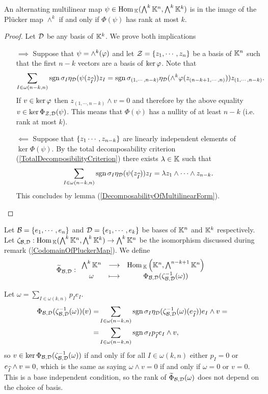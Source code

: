 \begin{proposition}\label{RankCriterionForImageOfPlucker}
An alternating multilinear map $\psi\in \mathrm{Hom}\,_{\mathbb{K}}(\bigwedge^k\mathbb{K}^n,\bigwedge^k\mathbb{K}^k)$ is in the image of the Pl\"ucker map $\wedge^k$ if and only if $\Phi(\psi)$ has rank at most $k$.
\end{proposition}
\begin{proof}
Let $\mathcal{D}$ be any basis of $\mathbb{K}^k$. We prove both implications
\setlength{\leftmargini}{0cm}
\begin{itemize}
\item[$\boxed{\implies}$] Suppose that $\psi=\wedge^k(\varphi)$ and let $\mathcal{Z}=\left\{{z_1,\cdots, z_{n}}\right\}$ be a basis of $\mathbb{K}^n$ such that the first $n-k$ vectors are a basis of $\ker \varphi$. Note that
\[\sum_{I\in \omega(n-k,n)}\mathrm{sgn}\,\sigma_I\eta_{\mathcal{D}}(\psi(z_{\widehat{I}}))z_I=\mathrm{sgn}\,\sigma_{(1,\cdots,n-k)}\eta_{\mathcal{D}}(\wedge^k\varphi(z_{(n-k+1,\cdots,n)}))z_{(1,\cdots, n-k)}.\]
If $v\in \ker \varphi$ then $z_{(1,\cdots, n-k)}\wedge v=0$ and therefore by the above equality $v\in \ker \Phi_{\mathcal{Z},\mathcal{D}}(\psi)$. This means that $\Phi(\psi)$ has a nullity of at least $n-k$ (i.e. rank at most $k$).
\item[$\boxed{\impliedby}$] Suppose that $\left\{{z_1\cdots, z_{n-k}}\right\}$ are linearly independent elements of $\ker \Phi(\psi)$. By the total decomposability criterion (\ref{TotalDecomposibilityCriterion}) there exists $\lambda\in\mathbb{K}$ such that
\[\sum_{I\in \omega(n-k,n)}\mathrm{sgn}\,\sigma_I\eta_{\mathcal{D}}(\psi(z_{\widehat{I}}))z_I=\lambda z_1\wedge\cdots \wedge z_{n-k}.\]
This concludes by lemma (\ref{DecomposabilityOfMultilinearForm}).
\end{itemize}
\setlength{\leftmargini}{0.5cm}
\end{proof}

\begin{definition}
Let $\mathcal{B}=\left\{{e_1,\cdots, e_n}\right\}$ and $\mathcal{D}=\left\{{e_1,\cdots, e_k}\right\}$ be bases of $\mathbb{K}^n$ and $\mathbb{K}^k$ respectively. Let $\zeta_{\mathcal{B},\mathcal{D}}:\mathrm{Hom}\,_{\mathbb{K}}(\bigwedge^k\mathbb{K}^n,\bigwedge^k\mathbb{K}^k)\to\bigwedge^k\mathbb{K}^n$ be the isomorphism discussed during remark (\ref{CodomainOfPluckerMap}). We define
\[\widetilde{\Phi}_{\mathcal{B},\mathcal{D}}:\begin{array}{ccc} {\bigwedge^k\mathbb{K}^n} & \longrightarrow & { \mathrm{Hom}\,_{\mathbb{K}}\left({\mathbb{K}^n,\bigwedge^{n-k+1}\mathbb{K}^n}\right)}\\ {\omega} & \longmapsto & {\Phi_{\mathcal{B},\mathcal{D}}(\zeta_{\mathcal{B},\mathcal{D}}^{-1}(\omega))} \end{array}\]
\end{definition}
\begin{remark}
Let $\omega=\sum_{I\in\omega(k,n)}p_Ie_I$.
\begin{align*}
\Phi_{\mathcal{B},\mathcal{D}}(\zeta_{\mathcal{B},\mathcal{D}}^{-1}(\omega))(v)=&\sum_{I\in\omega(n-k,n)}\mathrm{sgn}\,\sigma_I\eta_{\mathcal{D}}(\zeta_{\mathcal{B},\mathcal{D}}^{-1}(\omega)(e_{\widehat{I}}))e_I\wedge v=\\
=&\sum_{I\in\omega(n-k,n)}\mathrm{sgn}\,\sigma_Ip_{\widehat{I}}e_I\wedge v,
\end{align*}
so $v\in \ker \Phi_{\mathcal{B},\mathcal{D}}(\zeta_{\mathcal{B},\mathcal{D}}^{-1}(\omega))$ if and only if for all $I\in \omega(k,n)$ either $p_I=0$ or $e_{\widehat{I}}\wedge v=0$, which is the same as saying $\omega\wedge v= 0$ if and only if $\omega=0$ or $v=0$. This is a base independent condition, so the rank of $\widetilde{\Phi}_{\mathcal{B},\mathcal{D}}(\omega)$ does not depend on the choice of basis.
\end{remark}

